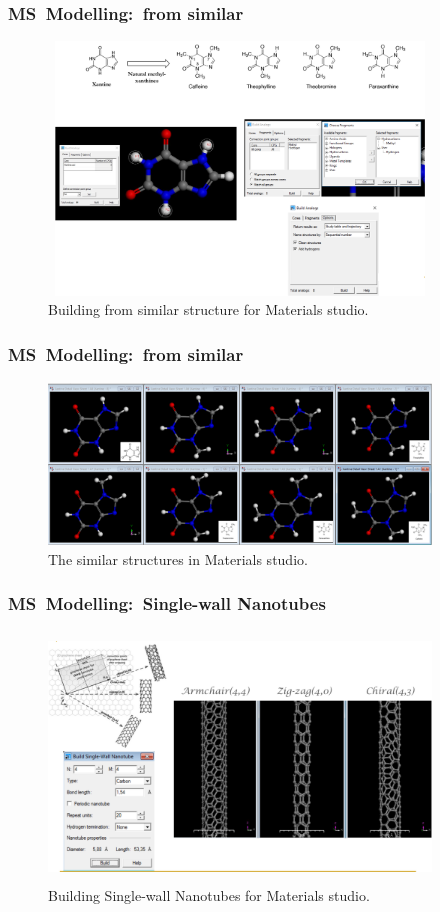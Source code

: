 \frame
{
	\frametitle{\textrm{MS~Modelling:~from similar}}
\begin{figure}[h!]
\centering
\vspace*{-0.16in}
\includegraphics[height=2.65in,width=4.00in,viewport=0 0 1150 800,clip]{Figures/MS-Building_Analogs.png}
\caption{\tiny \textrm{Building from similar structure for Materials studio.}}%
\label{MS-Building_analogs}
\end{figure}
}

\frame
{
	\frametitle{\textrm{MS~Modelling:~from similar}}
\begin{figure}[h!]
\centering
\includegraphics[height=1.70in,width=4.00in,viewport=0 0 1225 517,clip]{Figures/MS-Building_Analogs-examples.png}
\caption{\tiny \textrm{The similar structures in Materials studio.}}%
\label{MS-Building_analogs-examples}
\end{figure}
}

\frame
{
	\frametitle{\textrm{MS~Modelling:~Single-wall Nanotubes}}
\begin{figure}[h!]
\centering
\vspace*{-0.16in}
\includegraphics[height=2.60in,width=4.00in,viewport=0 0 1211 731,clip]{Figures/MS-Building_Single_wall-nanotube.png}
\caption{\tiny \textrm{Building Single-wall Nanotubes for Materials studio.}}%
\label{MS-Building_Single_wall-Nanotubes}
\end{figure}
}

